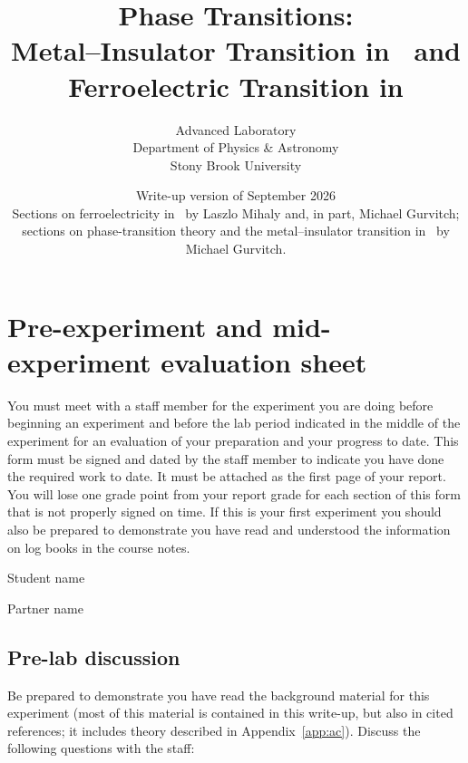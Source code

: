 \documentclass[11pt,a4paper]{article}
\title{Phase Transitions:\\
       Metal--Insulator Transition in \VOtwo\ and\\
       Ferroelectric Transition in \BTO}
\author{Advanced Laboratory\\
        Department of Physics \& Astronomy\\
        Stony Brook University}
\date{Write-up version of September 2026\\[2pt]
      \small Sections on ferroelectricity in \BTO\ by Laszlo Mihaly and, in
      part, Michael Gurvitch; sections on phase-transition theory and the
      metal--insulator transition in \VOtwo\ by Michael Gurvitch.}
\begin{document}
\maketitle
\thispagestyle{empty}

\clearpage
\tableofcontents
\clearpage

\section*{Pre-experiment and mid-experiment evaluation sheet}

You must meet with a staff member for the experiment you are doing before
beginning an experiment and before the lab period indicated in the middle of the
experiment for an evaluation of your preparation and your progress to date. This
form must be signed and dated by the staff member to indicate you have done the
required work to date. It must be attached as the first page of your report. You
will lose one grade point from your report grade for each section of this form
that is not properly signed on time. If this is your first experiment you should
also be prepared to demonstrate you have read and understood the information on
log books in the course notes.

\bigskip
\noindent Student name\ \hrulefill

\medskip
\noindent Partner name\ \hrulefill

\subsection*{Pre-lab discussion}

Be prepared to demonstrate you have read the background material for this
experiment (most of this material is contained in this write-up, but also in
cited references; it includes theory described in Appendix~\ref{app:ac}).
Discuss the following questions with the staff:
\end{document}
